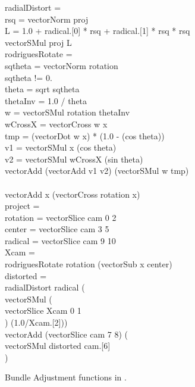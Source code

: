 \begin{figure}[t]
\hfill\begin{minipage}{.75\textwidth}\raggedright
{} radialDistort = \\
\tabt {} rsq = vectorNorm proj\\
\tabt {} L = 1.0 + radical.[0] * rsq + radical.[1] * rsq * rsq\\
\tabt vectorSMul proj L\\
 rodriguesRotate = \\
\tabt {} sqtheta = vectorNorm rotation\\
\tabt {} sqtheta != 0. \\
\tabt\tabt {} theta = sqrt sqtheta\\
\tabt\tabt {} thetaInv = 1.0 / theta\\
\tabt\tabt {} w = vectorSMul rotation thetaInv\\
\tabt\tabt {} wCrossX = vectorCross w x\\
\tabt\tabt {} tmp = (vectorDot w x) * (1.0 - (cos theta))\\
\tabt\tabt {} v1 = vectorSMul x (cos theta)\\
\tabt\tabt {} v2 = vectorSMul wCrossX (sin theta) \\
\tabt\tabt vectorAdd (vectorAdd v1 v2) (vectorSMul w tmp)\\
\tabt {} \\
\tabt\tabt vectorAdd x (vectorCross rotation x)\\
 project = \\
\tabt{} rotation = vectorSlice cam 0 2 \\
\tabt{} center = vectorSlice cam 3 5 \\
\tabt{} radical = vectorSlice cam 9 10 \\
\tabt{} Xcam =  \\
\tabt\tabt rodriguesRotate rotation (vectorSub x center) \\
\tabt{} distorted =  \\
\tabt\tabt radialDistort radical ( \\
\tabt\tabt \tabt vectorSMul ( \\
\tabt\tabt \tabt \tabt vectorSlice Xcam 0 1 \\
\tabt\tabt \tabt ) (1.0/Xcam.[2])) \\
\tabt vectorAdd (vectorSlice cam 7 8) ( \\
\tabt\tabt vectorSMul distorted cam.[6] \\
\tabt  )
\end{minipage}\hfill
\caption{Bundle Adjustment functions in \lafsharp{}.}
\label{fig:ba_code}
\end{figure}
